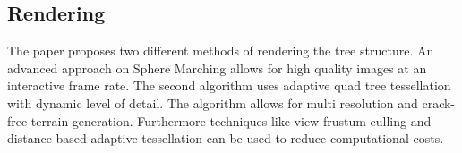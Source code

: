 \subsection{Rendering}
The paper proposes two different methods of rendering the tree structure. An advanced approach on Sphere Marching allows for high quality images at an interactive frame rate. The second algorithm uses adaptive quad tree tessellation with dynamic level of detail. The algorithm allows for multi resolution and crack-free terrain generation. Furthermore techniques like view frustum culling and distance based adaptive tessellation can be used to reduce computational costs. 
